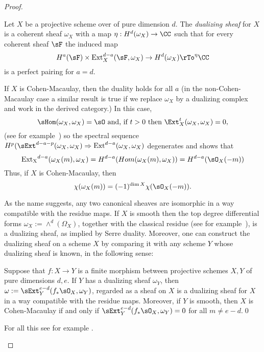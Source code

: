 \begin{proof}
\begin{definition}
Let $X$ be a projective scheme over of pure dimension $d$. The \emph{dualizing sheaf} for $X$ is a coherent sheaf $\omega_X$ 
with a map $\eta: H^d(\omega_X) \to \CC$ such that for every coherent sheaf  $\sF$ the induced map
$$
H^a(\sF) \times { \rm Ext}_X^{d-a}(\sF, \omega_X) \to H^d(\omega_X) \rTo^\eta \CC
$$
is a perfect pairing for $a=d$. 
\end{definition}


\begin{fact}
If $X$ is Cohen-Macaulay, then the duality holds for all $a$ (in the non-Cohen-Macaulay case a similar result is true if we replace $\omega_X$ by a dualizing complex
and work in the derived category.) In this case, 
$$
\sHom(\omega_X, \omega_X) = \sO \hbox{ and, if $t>0$ then } \Ext_X^{t}(\omega_X, \omega_X) = 0,
$$
(see for example~\cite[Theorem[Theorems 3.3.4 and 3.3.10d]{BrunsHerzog}) so the spectral sequence $H^p(\sExt^{d-a-p}(\omega_X, \omega_X) \Rightarrow {\rm Ext}^{d-a}(\omega_X, \omega_X)$ degenerates and shows that 
$$
{\rm Ext_X}^{d-a}(\omega_X(m), \omega_X) = H^{d-a}(Hom(\omega_X(m), \omega_X)) = H^{d-a}(\sO_X(-m))
$$
Thus, if $X$ is Cohen-Macaulay, then 
$$
\chi(\omega_X(m)) =(-1)^{\dim X}\chi(\sO_X(-m)).
$$

As the name suggests, any two canonical sheaves are isomorphic in a way compatible with the
residue maps. If $X$ is smooth then the top degree differential forms $\omega_X :=\wedge^d(\Omega_X)$,
together with the classical residue (see for example~\cite[p. 648, 708]{Griffiths-Harris1978}), is a dualizing sheaf, as implied by Serre duality. Moreover, one can construct the dualizing sheaf on a scheme
$X$ by comparing it with any scheme $Y$ whose dualizing sheaf is known, in the following sense:

\begin{theorem}\label{omega}\label{general adjunction}
Suppose that $f: X\to Y$ is a finite morphism between projective schemes $X,Y$ of pure dimensions $d,e$. If $Y$ has a dualizing sheaf $\omega_Y$,
then $\omega := \sExt_Y^{e-d}(f_*\sO_X,  \omega_Y)$, regarded as a sheaf on $X$ is a dualizing sheaf for $X$ in a way compatible with the residue maps.
Moreover, if $Y$ is smooth, then $X$ is Cohen-Macaulay if and only if $ \sExt_Y^{e-d}(f_*\sO_X,  \omega_Y)= 0$ for all $m\neq e-d$.\qed
\end{theorem}

For all this see for example \cite{AltmanKleiman}.
\end{fact}



\end{proof}
